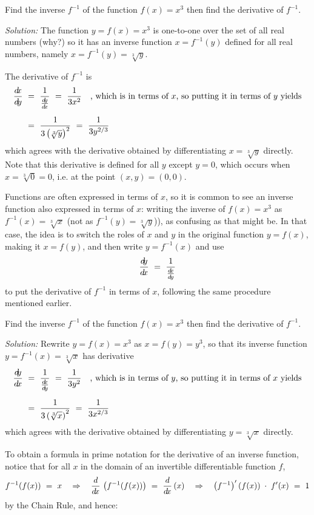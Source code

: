 \begin{exmp}\label{exmp:invderiv}
 Find the inverse $f^{-1}$ of the function $f(x) = x^3$ then find the derivative
 of $f^{-1}$.\vspace{1mm}
 \par\noindent\emph{Solution:} The function $y = f(x) = x^3$ is one-to-one over
 the set of all real numbers (why?) so it has an inverse function $x = f^{-1}(y)$
 defined for all real numbers, namely $x = f^{-1}(y) = \sqrt[3]{y}$.\vspace{1mm}
 
 \par\noindent The derivative of $f^{-1}$ is
 \begin{align*}
  \frac{d\negmedspace x}{d\!y} ~&=~ \frac{1}{\frac{d\negmedspace y}{d\!x}} ~=~ \frac{1}{3x^2} \quad\text{, which is in terms of $x$,
             so putting it in terms of $y$ yields}\\[6pt]
         &=~ \frac{1}{3 \left(\sqrt[3]{y}\right)^2} ~=~
		     \frac{1}{3 y^{2/3}}
 \end{align*}
 which agrees with the derivative obtained by differentiating $x = \sqrt[3]{y}$
 directly. Note that this derivative is defined for all $y$ except $y = 0$,
 which occurs when $x = \sqrt[3]{0} = 0$, i.e. at the point $(x,y) = (0,0)$.
\end{exmp}
\divider
\vspace{3mm}

Functions are often expressed in terms of $x$, so it is common to see an
inverse function also expressed in terms of $x$: writing the inverse
of $f(x) = x^3$ as $f^{-1}(x) = \sqrt[3]{x}$ (not as
$f^{-1}(y) = \sqrt[3]{y}$)), as confusing as that might be. In that case, the
idea is to switch the roles of $x$ and $y$ in the original function $y = f(x)$,
making it $x = f(y)$, and then write $y = f^{-1}(x)$ and use
\[
 \frac{d\negmedspace y}{d\!x} ~=~ \frac{1}{\frac{d\negmedspace x}{d\!y}}
\]
to put the derivative of $f^{-1}$ in terms of $x$, following the same procedure
mentioned earlier.

\begin{exmp}\label{exmp:invderivalt}
 Find the inverse $f^{-1}$ of the function $f(x) = x^3$ then find the derivative
 of $f^{-1}$.\vspace{1mm}
 \par\noindent\emph{Solution:} Rewrite $y = f(x) = x^3$ as
 $x = f(y) = y^3$, so that its inverse function $y = f^{-1}(x)= \sqrt[3]{x} $
 has derivative
 \begin{align*}
  \frac{d\negmedspace y}{d\!x} ~&=~ \frac{1}{\frac{d\negmedspace x}{d\!y}} ~=~ \frac{1}{3y^2} \quad\text{, which is in terms of $y$,
             so putting it in terms of $x$ yields}\\[6pt]
         &=~ \frac{1}{3 \left(\sqrt[3]{x}\right)^2} ~=~
		     \frac{1}{3 x^{2/3}}
 \end{align*}
 which agrees with the derivative obtained by differentiating $y = \sqrt[3]{x}$
 directly.
\end{exmp}
\divider
\newpage
To obtain a formula in prime notation for the derivative of an inverse function,
notice that for all $x$ in the domain of an invertible differentiable function
$f$,
\[
 f^{-1}(f(x)) ~=~ x \quad\Rightarrow\quad
 \frac{d}{d\!x}\,\left(f^{-1}(f(x))\right) ~=~ \frac{d}{d\!x}\,(x) \quad\Rightarrow\quad
 \left(f^{-1}\right)'(f(x)) \;\cdot\; f'(x) ~=~ 1
\]
by the Chain Rule, and hence:

